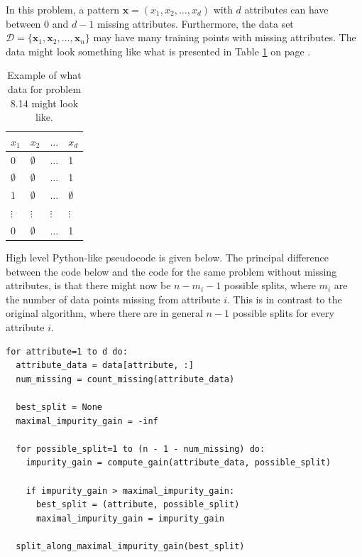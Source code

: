 \documentclass[12pt, a4paper]{article}
\newcommand{\D}{\mathcal{D}}
\newcommand{\vect}[1]{\bm{#1}}
\begin{document}
{In this problem, a pattern $\vect{x} = (x_1, x_2, \dots ,x_d)$ with $d$ attributes can have between $0$ and $d-1$ missing attributes.
Furthermore, the data set $\D = \{\vect{x}_1, \vect{x}_2, \dots, \vect{x}_n \}$ may have many training points with missing attributes.
The data might look something like what is presented in Table \ref{table:problem8_14} on page \pageref{table:problem8_14}.

\begin{table}[hb!]
	\centering
	\caption{Example of what data for problem 8.14 might look like.}
	\begin{tabular}{@{}llll@{}} \toprule
		$x_1$	& $x_2$ & $\dots$ & $x_d$  \\ \midrule
		0 & $\emptyset$ & $\dots$ & 1 \\
		$\emptyset$ & $\emptyset$ & $\dots$ &  1 \\
		1 & $\emptyset$ & $\dots$ & $\emptyset$ \\
		$\vdots$ & $\vdots$ & $\vdots$ & $\vdots$ \\
		0 & $\emptyset$ & $\dots$ & 1 \\ \bottomrule
	\end{tabular}
	\label{table:problem8_14}
\end{table}

High level Python-like pseudocode is given below. 
The principal difference between the code below and the code for the same problem without missing attributes, is that there might now be $n - m_i - 1$ possible splits, where $m_i$ are the number of data points missing from attribute $i$.
This is in contrast to the original algorithm, where there are in general $n-1$ possible splits for every attribute $i$.
\begin{Verbatim}
for attribute=1 to d do:
  attribute_data = data[attribute, :]
  num_missing = count_missing(attribute_data)
  
  best_split = None
  maximal_impurity_gain = -inf
  
  for possible_split=1 to (n - 1 - num_missing) do:
    impurity_gain = compute_gain(attribute_data, possible_split)
    
    if impurity_gain > maximal_impurity_gain:
	  best_split = (attribute, possible_split)
	  maximal_impurity_gain = impurity_gain
	  
  split_along_maximal_impurity_gain(best_split)
\end{Verbatim}


}
\end{document}
